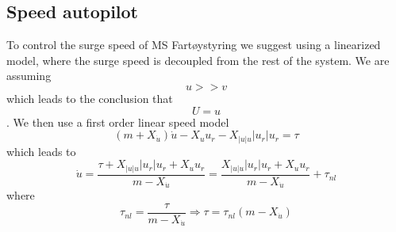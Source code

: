\subsection{Speed autopilot}\label{sec:prob1.2}
To control the surge speed of MS Fartøystyring we suggest using a linearized model, where the surge speed is decoupled from the rest of the system. We are assuming $$u>>v$$ which leads to the conclusion that $$U=u$$.
We then use a first order linear speed model
\begin{equation}
(m+X_{\dot{u}})\dot{u}-X_u u_r - X_{|u|u} | u_r | u_r=\tau
\end{equation}
which leads to
\begin{equation}
\dot{u} = \frac{ \tau + X_{|u|u} |u_r| u_r +X_u u_r }{ m-X_{\dot{u}} } 
= \frac{X_{|u|u} |u_r| u_r +X_u u_r }{ m-X_{\dot{u}} } + \tau_{nl}
\end{equation}
where
\begin{equation}
\tau_{nl}  = \frac{ \tau}{ m-X_{\dot{u}} } \Rightarrow \tau = \tau_{nl}(m-X_{\dot{u}})
\end{equation}